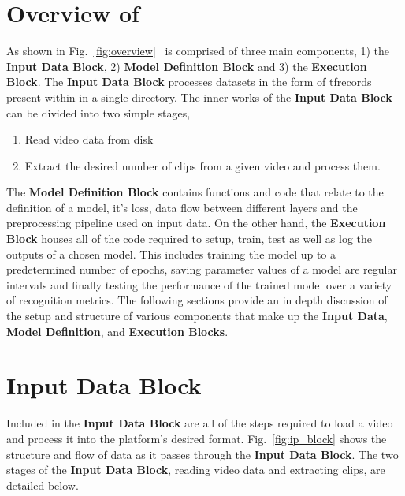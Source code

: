 \documentclass{llncs}
\begin{document}
\section{Overview of \acro}
\label{sec:overview}

As shown in Fig.~\ref{fig:overview} \acro~is comprised of three main components, 1) the \textbf{Input Data Block}, 2) \textbf{Model Definition Block} and 3) the \textbf{Execution Block}.
The \textbf{Input Data Block} processes datasets in the form of tfrecords present within in a single directory. 
The inner works of the \textbf{Input Data Block} can be divided into two simple stages,
\begin{enumerate}
\item Read video data from disk
\item Extract the desired number of clips from a given video and process them.
\end{enumerate}

The \textbf{Model Definition Block} contains functions and code that relate to the definition of a model, it's loss, data flow between different layers and the preprocessing pipeline used on input data.
On the other hand, the \textbf{Execution Block} houses all of the code required to setup, train, test as well as log the outputs of a chosen model.
This includes training the model up to a predetermined number of epochs, saving parameter values of a model are regular intervals and finally testing the performance of the trained model over a variety of recognition metrics.
The following sections provide an in depth discussion of the setup and structure of various components that make up the \textbf{Input Data}, \textbf{Model Definition}, and \textbf{Execution Blocks}.

\section{Input Data Block}
\label{sec:ipblock}
Included in the \textbf{Input Data Block} are all of the steps required to load a video and process it into the platform's desired format.
Fig.~\ref{fig:ip_block} shows the structure and flow of data as it passes through the \textbf{Input Data Block}.
The two stages of the \textbf{Input Data Block}, reading video data and extracting clips, are detailed below.
\end{document}

